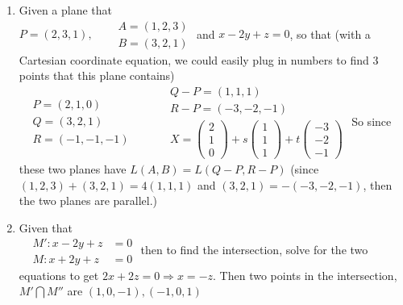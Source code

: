 \documentclass[twoside]{amsart}
\theoremstyle{plain}
\theoremstyle{definition}
\newcommand{\exercisehead}[1]
  {\smallskip
   \noindent{\small\bf Exercise #1.}}
\begin{document}
\exercisehead{9} 
\begin{enumerate}
\item Given a plane that \\
$P = (2,3,1), \quad \begin{aligned}
& A = (1,2,3) \\
& B = (3,2,1) 
\end{aligned}$ and $x-2y + z = 0$, so that (with a Cartesian coordinate equation, we could easily plug in numbers to find 3 points that this plane contains) \\
$\begin{aligned}
& P = (2,1,0) \\
& Q = (3,2,1) \\
& R = (-1,-1,-1)
\end{aligned} \quad \quad \begin{aligned}
  & Q - P = (1,1,1) \\
  & R - P = (-3,-2,-1) \\
  & X = \left( \begin{matrix} 2 \\ 1 \\ 0 \end{matrix} \right) + s \left( \begin{matrix} 1 \\ 1 \\ 1 \end{matrix} \right) + t \left( \begin{matrix} -3 \\ -2 \\ -1 \end{matrix} \right)
\end{aligned}$
So since these two planes have $L(A,B) = L(Q-P,R-P)$ (since $(1,2,3)+(3,2,1) = 4(1,1,1)$ and $(3,2,1) = -(-3,-2,-1)$, then the two planes are parallel.)  \\
\item Given that \\ 
$\begin{aligned}
 & M' : x- 2 y + z & = 0  \\
 & M : x + 2y + z  & = 0  
\end{aligned}$ \quad then to find the intersection, solve for the two equations to get $2x + 2z =0 \Longrightarrow x = -z$.  Then two points in the intersection, $M' \bigcap M''$ are $\boxed{ (1,0,-1), (-1,0,1) }$
\end{enumerate}
\end{document}
